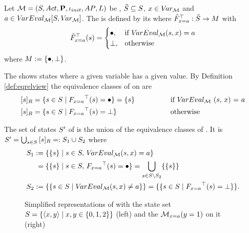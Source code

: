 \documentclass[preview]{standalone}
\begin{document}
\begin{definition}
	Let ${{{\mathcal{M}}}} = {{({S}, {Act}, {\textbf{P}}, {\iota_{init}}, {AP}, {L})}}$ be \achgphN, ${\tilde{{S}}} \subseteq {S}$, ${x} \in {V\!ar_{\ensuremath{{{\mathcal{M}}}}}}$ and $\varval \in \varevalimg$. The \viewN \viewparamvalueseq is defined by its \grpfctN \gfctparamvalueseq where ${{\tilde{F}_{{{x} = {a}}}}^{\top}} : {\tilde{{S}}} \to {\ensuremath{{M}}}$ with
	\[
	{{\tilde{F}_{{{x} = {a}}}}^{\top}}({s}) =
	\begin{cases}
			{\bullet}, &\text{if } {V\!arEval_{\ensuremath{{{\mathcal{M}}}}}}({s}, {x}) = {a}\\
			{\bot}, &\text{otherwise}
	\end{cases}
	\]
	where ${{M}} := {\{{\bullet}, {\bot}\}}$.
\end{definition}

\noindent The \viewN \viewparamvalueseq shows states where a given variable has a given value. 
By Definition \ref{def:eqrelview} the equivalence classes of \eqrelview on \states are
\begin{alignat*}{3}
	\eqclassv &= \{\state \in \states \mid \gfctparamvalueseq(\state) = \remelem\} = \{\state\} \quad\quad\quad\quad &&\text{if \vareval(\state, \var) = \varval} \\
	\eqclassv &= \{\state \in \states \mid \gfctparamvalueseq(\state) = \notppty\} &&\text{otherwise}
\end{alignat*}

\noindent The set of states ${S}'$ of \viewparamvalueseq is the union of the equivalence classes of \eqrelview. It is ${S}' = \bigcup_{{s} \in {S}} {{[{s}]_{{R}}}} =: {S}_1 \cup {S}_2$ where
\begin{align*}
	\states_1 &:= \{\{\state\} \mid \state \in \states, \, \vareval(\state, \var) = \varval\} \\
	&\;= \{\{\state\} \mid \state \in \states, \, \gfctparamvalueseq(\state) = \remelem\} = \nogroupstates \\
	\states_2 &:= \{\{\state \in \states \mid \vareval(\state, \var) \neq \varval\}\} = \{\{\state \in \states \mid \gfctparamvalueseq(\state) = \notppty\}\}.
\end{align*}

\begin{figure}[!htb]
	\begin{minipage}{.6\textwidth}
		
	\end{minipage}%
	\begin{minipage}{.5\textwidth}
		
	\end{minipage}
	\caption{Simplified representations of \mdp with the state set ${S} = \{{\langle x,y\rangle} \mid x,y \in \{0, 1, 2\}\}$ (left) and the \viewN ${{{{{\mathcal{M}}}}_{{{x} = {a}}}}}(y=1)$ on it (right)}
	\label{fig:varsValEq} 
\end{figure}
\end{document}
